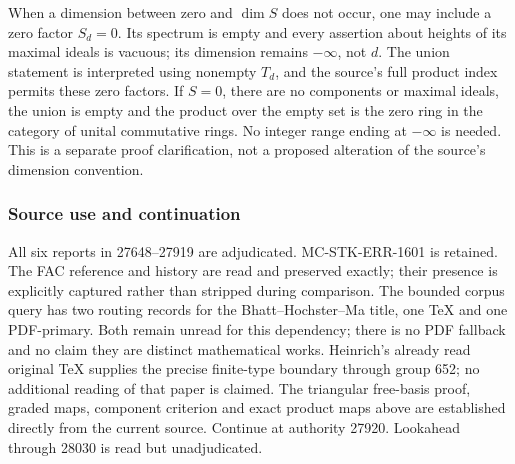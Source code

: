 When a dimension between zero and \(\dim S\) does not occur, one may include a zero factor \(S_d=0\). Its spectrum is empty and every assertion about heights of its maximal ideals is vacuous; its dimension remains \(-\infty\), not \(d\). The union statement is interpreted using nonempty \(T_d\), and the source's full product index permits these zero factors. If \(S=0\), there are no components or maximal ideals, the union is empty and the product over the empty set is the zero ring in the category of unital commutative rings. No integer range ending at \(-\infty\) is needed. This is a separate proof clarification, not a proposed alteration of the source's dimension convention.

\subsubsection{Source use and continuation}\label{algebra-proof-025-source-use-and-continuation}

All six reports in 27648--27919 are adjudicated. MC-STK-ERR-1601 is retained. The FAC reference and history are read and preserved exactly; their presence is explicitly captured rather than stripped during comparison. The bounded corpus query has two routing records for the Bhatt--Hochster--Ma title, one TeX and one PDF-primary. Both remain unread for this dependency; there is no PDF fallback and no claim they are distinct mathematical works. Heinrich's already read original TeX supplies the precise finite-type boundary through group 652; no additional reading of that paper is claimed. The triangular free-basis proof, graded maps, component criterion and exact product maps above are established directly from the current source. Continue at authority 27920. Lookahead through 28030 is read but unadjudicated.
